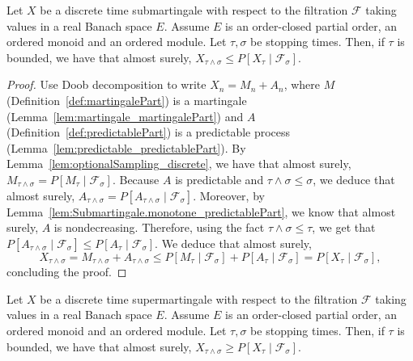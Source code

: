\begin{lemma}\label{lem:optionalSampling_discrete_submartingale}
  \leanok
Let $X$ be a discrete time submartingale with respect to the filtration $\mathcal{F}$ taking values in a real Banach space $E$. Assume $E$ is an order-closed partial order, an ordered monoid and an ordered module. Let $\tau, \sigma$ be stopping times. Then, if $\tau$ is bounded, we have that almost surely, $X_{\tau \wedge \sigma} \le P[X_{\tau} \mid \mathcal{F}_{\sigma}]$.
\end{lemma}

\begin{proof}
Use Doob decomposition to write $X_n = M_n + A_n$, where $M$ (Definition~\ref{def:martingalePart}) is a martingale (Lemma~\ref{lem:martingale_martingalePart}) and $A$ (Definition~\ref{def:predictablePart}) is a predictable process (Lemma~\ref{lem:predictable_predictablePart}). By Lemma~\ref{lem:optionalSampling_discrete}, we have that almost surely, $M_{\tau \wedge \sigma} = P[M_{\tau} \mid \mathcal{F}_{\sigma}]$. Because $A$ is predictable and $\tau \wedge \sigma \le \sigma$, we deduce that almost surely, $A_{\tau \wedge \sigma} = P[A_{\tau \wedge \sigma} \mid \mathcal{F}_\sigma]$. Moreover, by Lemma~\ref{lem:Submartingale.monotone_predictablePart}, we know that almost surely, $A$ is nondecreasing. Therefore, using the fact $\tau \wedge \sigma \le \tau$, we get that $P[A_{\tau \wedge \sigma} \mid \mathcal{F}_\sigma] \le P[A_\tau \mid \mathcal{F}_\sigma]$. We deduce that almost surely,
$$X_{\tau \wedge \sigma} = M_{\tau \wedge \sigma} + A_{\tau \wedge \sigma} \le P[M_\tau \mid \mathcal{F}_\sigma] + P[A_\tau \mid \mathcal{F}_\sigma] = P[X_\tau \mid \mathcal{F}_\sigma],$$
concluding the proof.
\end{proof}

\begin{lemma}\label{lem:optionalSampling_discrete_supermartingale}
  \leanok
Let $X$ be a discrete time supermartingale with respect to the filtration $\mathcal{F}$ taking values in a real Banach space $E$. Assume $E$ is an order-closed partial order, an ordered monoid and an ordered module. Let $\tau, \sigma$ be stopping times. Then, if $\tau$ is bounded, we have that almost surely, $X_{\tau \wedge \sigma} \ge P[X_{\tau} \mid \mathcal{F}_{\sigma}]$.
\end{lemma}

